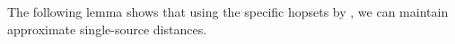 The following lemma shows that using the specific hopsets by \cite{LN2020}, we can maintain approximate single-source distances. 



